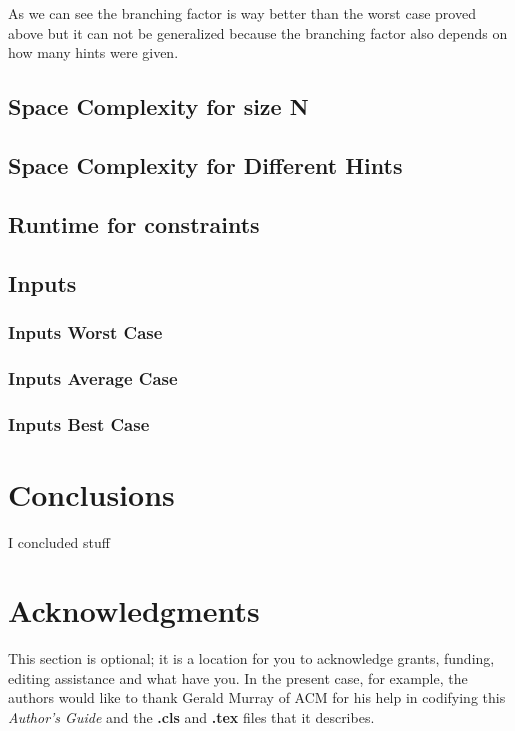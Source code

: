 \documentclass{sig-alternate}
\begin{document}
As we can see the branching factor is way better than the worst case proved above but it can not be generalized because the branching factor also depends on how many hints were given. 

\subsection{Space Complexity for size N}

\subsection{Space Complexity for Different Hints}

\subsection{Runtime for constraints}

\subsection{Inputs} 
\subsubsection{Inputs Worst Case}
\subsubsection{Inputs Average Case}
\subsubsection{Inputs Best Case}

 
\section{Conclusions}
I concluded stuff

\section{Acknowledgments}
This section is optional; it is a location for you
to acknowledge grants, funding, editing assistance and
what have you.  In the present case, for example, the
authors would like to thank Gerald Murray of ACM for
his help in codifying this \textit{Author's Guide}
and the \textbf{.cls} and \textbf{.tex} files that it describes.

%
\cite{*}

%
%
\end{document}
